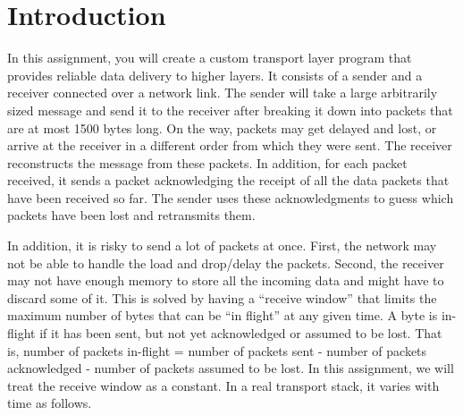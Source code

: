 \documentclass{article}
\begin{document}
\section{Introduction}

In this assignment, you will create a custom transport layer program that provides reliable data delivery to higher layers. It consists of a sender and a receiver connected over a network link. The sender will take a large arbitrarily sized message and send it to the receiver after breaking it down into packets that are at most 1500 bytes long. On the way, packets may get delayed and lost, or arrive at the receiver in a different order from which they were sent. The receiver reconstructs the message from these packets. In addition, for each packet received, it sends a packet acknowledging the receipt of all the data packets that have been received so far. The sender uses these acknowledgments to guess which packets have been lost and retransmits them.

In addition, it is risky to send a lot of packets at once. First, the network may not be able to handle the load and drop/delay the packets. Second, the receiver may not have enough memory to store all the incoming data and might have to discard some of it. This is solved by having a ``receive window'' that limits the maximum number of bytes that can be ``in flight'' at any given time. A byte is in-flight if it has been sent, but not yet acknowledged or assumed to be lost. That is, number of packets in-flight = number of packets sent - number of packets acknowledged - number of packets assumed to be lost. In this assignment, we will treat the receive window as a constant. In a real transport stack, it varies with time as follows.
\end{document}
